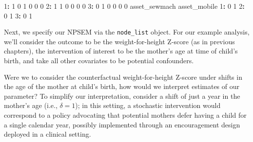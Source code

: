 \documentclass[12pt, krantz2,]{krantz}
\newenvironment{Shaded}{\begin{snugshade}}{\end{snugshade}}
\newcommand{\DataTypeTok}[1]{\textcolor[rgb]{0.27,0.27,0.27}{#1}}
\newcommand{\DecValTok}[1]{\textcolor[rgb]{0.06,0.06,0.06}{#1}}
\newcommand{\KeywordTok}[1]{\textcolor[rgb]{0.27,0.27,0.27}{\textbf{#1}}}
\newcommand{\NormalTok}[1]{#1}
\newcommand{\OperatorTok}[1]{\textcolor[rgb]{0.43,0.43,0.43}{\textbf{#1}}}
\newcommand{\StringTok}[1]{\textcolor[rgb]{0.5,0.5,0.5}{#1}}
\theoremstyle{definition}
\theoremstyle{definition}
\theoremstyle{definition}
\newcommand{\1}{\mathbbm{1}}
\begin{document}
\begin{Shaded}
\begin{Highlighting}[]
\DecValTok{1}\OperatorTok{:}\StringTok{          }\DecValTok{1}            \DecValTok{0}        \DecValTok{1}            \DecValTok{0}          \DecValTok{0}          \DecValTok{0}
\DecValTok{2}\OperatorTok{:}\StringTok{          }\DecValTok{1}            \DecValTok{1}        \DecValTok{0}            \DecValTok{0}          \DecValTok{0}          \DecValTok{0}
\DecValTok{3}\OperatorTok{:}\StringTok{          }\DecValTok{0}            \DecValTok{1}        \DecValTok{0}            \DecValTok{0}          \DecValTok{0}          \DecValTok{0}
\NormalTok{   asset_sewmach asset_mobile}
\DecValTok{1}\OperatorTok{:}\StringTok{             }\DecValTok{0}            \DecValTok{1}
\DecValTok{2}\OperatorTok{:}\StringTok{             }\DecValTok{0}            \DecValTok{1}
\DecValTok{3}\OperatorTok{:}\StringTok{             }\DecValTok{0}            \DecValTok{1}
\end{Highlighting}
\end{Shaded}

Next, we specify our NPSEM via the \texttt{node\_list} object. For our example analysis,
we'll consider the outcome to be the weight-for-height Z-score (as in previous
chapters), the intervention of interest to be the mother's age at time of
child's birth, and take all other covariates to be potential confounders.

\begin{Shaded}
\end{Shaded}

Were we to consider the counterfactual weight-for-height Z-score under shifts in
the age of the mother at child's birth, how would we interpret estimates of our
parameter? To simplify our interpretation, consider a shift of just a year in
the mother's age (i.e., \(\delta = 1\)); in this setting, a stochastic
intervention would correspond to a policy advocating that potential mothers
defer having a child for a single calendar year, possibly implemented through an
encouragement design deployed in a clinical setting.
\end{document}

